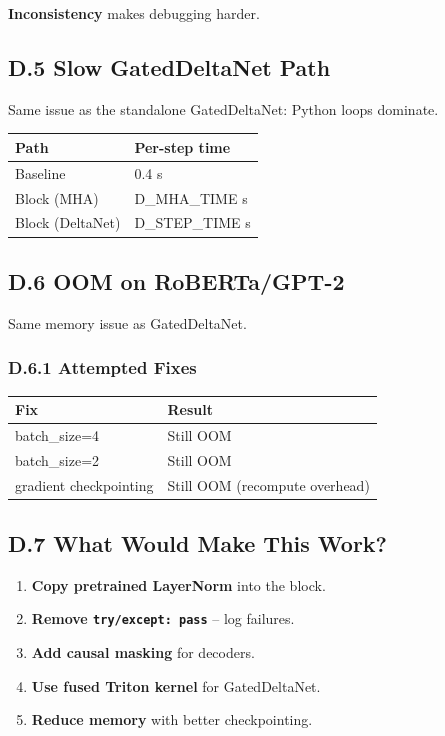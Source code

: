 \textbf{Inconsistency} makes debugging harder.

\subsection{D.5 Slow GatedDeltaNet Path}

Same issue as the standalone GatedDeltaNet: Python loops dominate.

\begin{table}[H]
\centering
\small
\begin{tabular}{ll}
\toprule
\textbf{Path} & \textbf{Per-step time} \\
\midrule
Baseline & 0.4 s \\
Block (MHA) & {{D\_MHA\_TIME}} s \\
Block (DeltaNet) & {{D\_STEP\_TIME}} s \\
\bottomrule
\end{tabular}
\end{table}

\subsection{D.6 OOM on RoBERTa/GPT-2}

Same memory issue as GatedDeltaNet.

\subsubsection{D.6.1 Attempted Fixes}

\begin{table}[H]
\centering
\small
\begin{tabular}{ll}
\toprule
\textbf{Fix} & \textbf{Result} \\
\midrule
batch\_size=4 & Still OOM \\
batch\_size=2 & Still OOM \\
gradient checkpointing & Still OOM (recompute overhead) \\
\bottomrule
\end{tabular}
\end{table}

\subsection{D.7 What Would Make This Work?}

\begin{enumerate}
\item \textbf{Copy pretrained LayerNorm} into the block.
\item \textbf{Remove \texttt{try/except: pass}} -- log failures.
\item \textbf{Add causal masking} for decoders.
\item \textbf{Use fused Triton kernel} for GatedDeltaNet.
\item \textbf{Reduce memory} with better checkpointing.

\end{enumerate}
